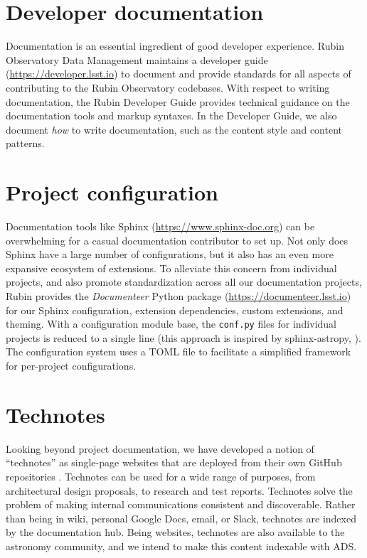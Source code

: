 \documentclass[11pt,twoside]{article}
\begin{document}
\section{Developer documentation}

Documentation is an essential ingredient of good developer experience.
Rubin Observatory Data Management maintains a developer guide (\url{https://developer.lsst.io}) to document and provide standards for all aspects of contributing to the Rubin Observatory codebases.
With respect to writing documentation, the Rubin Developer Guide provides technical guidance on the documentation tools and markup syntaxes.
In the Developer Guide, we also document \emph{how} to write documentation, such as the content style and content patterns.

\section{Project configuration}

Documentation tools like Sphinx (\url{https://www.sphinx-doc.org}) can be overwhelming for a casual documentation contributor to set up.
Not only does Sphinx have a large number of configurations, but it also has an even more expansive ecosystem of extensions.
To alleviate this concern from individual projects, and also promote standardization across all our documentation projects, Rubin provides the \textit{Documenteer} Python package (\url{https://documenteer.lsst.io}) for our Sphinx configuration, extension dependencies, custom extensions, and theming.
With a configuration module base, the \texttt{conf.py} files for individual projects is reduced to a single line (this approach is inspired by sphinx-astropy, \citet{thomas_robitaille_2023_8015243}).
The configuration system uses a TOML file to facilitate a simplified framework for per-project configurations.


\label{sec:technotes}
\section{Technotes}

Looking beyond project documentation, we have developed a notion of ``technotes'' as single-page websites that are deployed from their own GitHub repositories \citep{SQR-000}.
Technotes can be used for a wide range of purposes, from architectural design proposals, to research and test reports.
Technotes solve the problem of making internal communications consistent and discoverable.
Rather than being in wiki, personal Google Docs, email, or Slack, technotes are indexed by the documentation hub.
Being websites, technotes are also available to the astronomy community, and we intend to make this content indexable with ADS.
\end{document}
